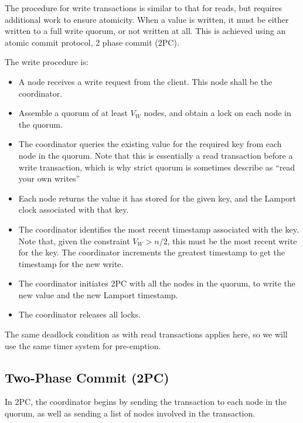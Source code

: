 \documentclass[12pt,a4paper]{article}
\begin{document}
The procedure for write transactions is similar to that for reads, but requires additional work to ensure atomicity. When a value is written, it must be either written to a full write quorum, or not written at all. This is achieved using an atomic commit protocol, 2 phase commit (2PC).

The write procedure is:

\begin{itemize}
  \item
  A node receives a write request from the client. This node shall be the coordinator.

  \item
  Assemble a quorum of at least $V_W$ nodes, and obtain a lock on each node in the quorum.

  \item
  The coordinator queries the existing value for the required key from each node in the quorum. Note that this is essentially a read transaction before a write transaction, which is why strict quorum is sometimes describe as ``read your own writes''

  \item
  Each node returns the value it has stored for the given key, and the Lamport clock associated with that key.

  \item
  The coordinator identifies the most recent timestamp associated with the key. Note that, given the constraint $V_W > n / 2$, this must be the most recent write for the key. The coordinator increments the greatest timestamp to get the timestamp for the new write.

  \item
  The coordinator initiates 2PC with all the nodes in the quorum, to write the new value and the new Lamport timestamp.

  \item
  The coordinator releases all locks.

\end{itemize}

The same deadlock condition as with read transactions applies here, so we will use the same timer system for pre-emption.

\subsection*{Two-Phase Commit (2PC)}

In 2PC, the coordinator begins by sending the transaction to each node in the quorum, as well as sending a list of nodes involved in the transaction.
\end{document}
